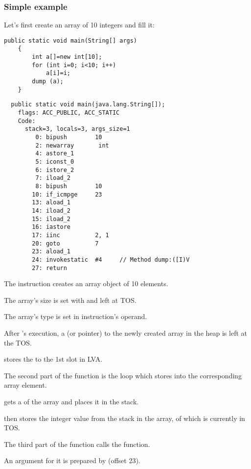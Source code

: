 \subsubsection{Simple example}

Let's first create an array of 10 integers and fill it:

\begin{lstlisting}[style=customjava]
	public static void main(String[] args) 
	{
		int a[]=new int[10];
		for (int i=0; i<10; i++)
			a[i]=i;
		dump (a);
	}
\end{lstlisting}

\begin{lstlisting}
  public static void main(java.lang.String[]);
    flags: ACC_PUBLIC, ACC_STATIC
    Code:
      stack=3, locals=3, args_size=1
         0: bipush        10
         2: newarray       int
         4: astore_1      
         5: iconst_0      
         6: istore_2      
         7: iload_2       
         8: bipush        10
        10: if_icmpge     23
        13: aload_1       
        14: iload_2       
        15: iload_2       
        16: iastore       
        17: iinc          2, 1
        20: goto          7
        23: aload_1       
        24: invokestatic  #4     // Method dump:([I)V
        27: return        
\end{lstlisting}

The  instruction creates an array object of 10  elements.

The array's size is set with  and left at \ac{TOS}.

The array's type is set in  instruction's operand.

After 's execution, a  (or pointer) to the newly created array in the heap 
is left at the \ac{TOS}.

 stores the  to the 1st slot in \ac{LVA}.

The second part of the \main function is the loop which stores  into the corresponding
array element.

 gets a  of the array and places it in the stack.

 then stores the integer value from the stack in the array, 
 of which is currently in \ac{TOS}.

The third part of the \main function calls the  function.

An argument for it is prepared by  (offset 23).

